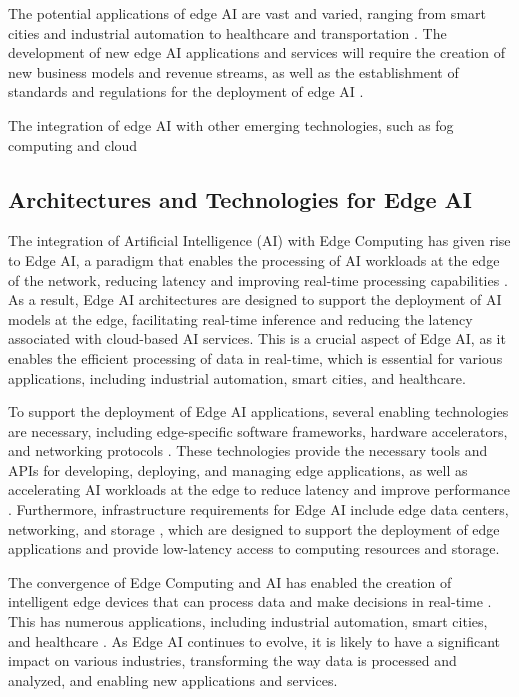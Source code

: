 \documentclass[11pt,a4paper]{article}
\begin{document}
The potential applications of edge AI are vast and varied, ranging from smart cities and industrial automation to healthcare and transportation \cite{arxiv:2201.00242}. The development of new edge AI applications and services will require the creation of new business models and revenue streams, as well as the establishment of standards and regulations for the deployment of edge AI \cite{arxiv:1909.08747}. 

The integration of edge AI with other emerging technologies, such as fog computing and cloud


\subsection{Architectures and Technologies for Edge AI}


The integration of Artificial Intelligence (AI) with Edge Computing has given rise to Edge AI, a paradigm that enables the processing of AI workloads at the edge of the network, reducing latency and improving real-time processing capabilities \cite{arxiv:1702.05309}. As a result, Edge AI architectures are designed to support the deployment of AI models at the edge, facilitating real-time inference and reducing the latency associated with cloud-based AI services. This is a crucial aspect of Edge AI, as it enables the efficient processing of data in real-time, which is essential for various applications, including industrial automation, smart cities, and healthcare.

To support the deployment of Edge AI applications, several enabling technologies are necessary, including edge-specific software frameworks, hardware accelerators, and networking protocols \cite{arxiv:1807.00976}. These technologies provide the necessary tools and APIs for developing, deploying, and managing edge applications, as well as accelerating AI workloads at the edge to reduce latency and improve performance \cite{arxiv:2003.12488}. Furthermore, infrastructure requirements for Edge AI include edge data centers, networking, and storage \cite{arxiv:1810.00305}, which are designed to support the deployment of edge applications and provide low-latency access to computing resources and storage.

The convergence of Edge Computing and AI has enabled the creation of intelligent edge devices that can process data and make decisions in real-time \cite{arxiv:2003.12172}. This has numerous applications, including industrial automation, smart cities, and healthcare \cite{arxiv:1912.00595}. As Edge AI continues to evolve, it is likely to have a significant impact on various industries, transforming the way data is processed and analyzed, and enabling new applications and services.
\end{document}
